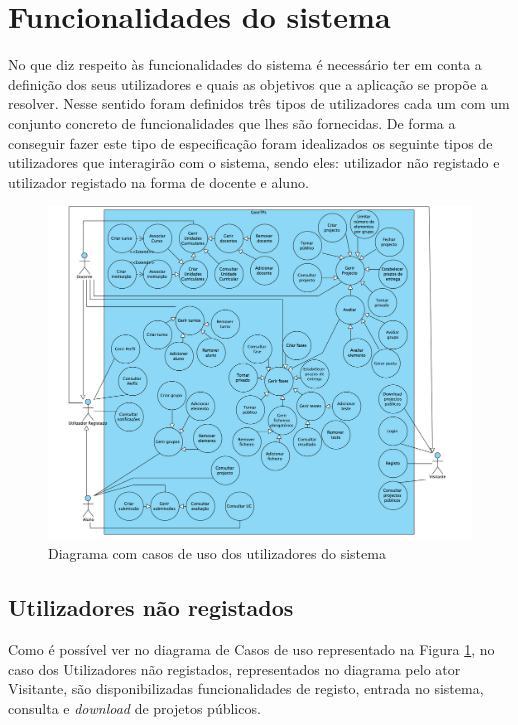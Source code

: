 \section{Funcionalidades do sistema}

No que diz respeito às funcionalidades do sistema é necessário ter em conta a definição dos seus 
utilizadores e quais as objetivos que a aplicação se propõe a resolver.
Nesse sentido foram definidos três tipos de utilizadores cada um com um conjunto concreto de 
funcionalidades que lhes são fornecidas.
De forma a conseguir fazer este tipo de especificação foram idealizados os seguinte tipos de utilizadores
que interagirão com o sistema, sendo eles: utilizador não registado e utilizador registado na forma de 
docente e aluno.

\begin{figure}[H] 
   \centering
   \includegraphics[width=1\textwidth]{images/funcionalidades/usecases.png}
    \caption{Diagrama com casos de uso dos utilizadores do sistema}
    \label{fig: usecases}
 \end{figure}

\subsection{Utilizadores não registados}

Como é possível ver no diagrama de Casos de uso representado na Figura \ref{fig: usecases}, no caso 
dos Utilizadores não registados, representados no diagrama pelo ator Visitante, são disponibilizadas
funcionalidades de registo, entrada no sistema, consulta e \textit{download} de projetos públicos.

